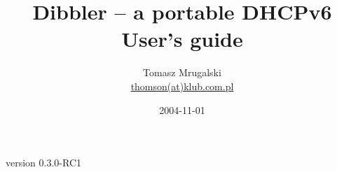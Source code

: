\documentclass[11pt]{article}
\author{Tomasz Mrugalski\\ \small{\href{mailto:thomson(at)klub.com.pl}{thomson(at)klub.com.pl}}}
\date{2004-11-01}
\title{Dibbler -- a portable DHCPv6\\User's guide}
\begin{document}
\vspace{-4cm}
\maketitle
\vspace{-1cm}
\begin{center}
version 0.3.0-RC1
\end{center}

\newpage
\tableofcontents


\newpage










\end{document}
